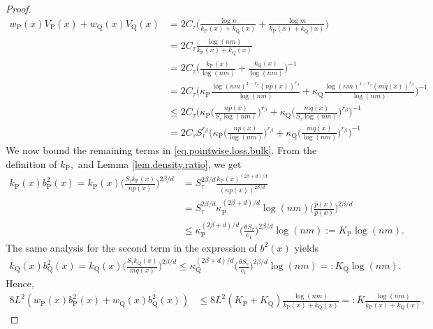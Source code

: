 \documentclass[10pt,a4paper]{amsart}
\renewcommand{\P}{\operatorname{P}}
\newcommand{\Q}{\operatorname{Q}}
\renewcommand{\k}{\kappa}
\newcommand{\ol}{\overline}
\newcommand{\wh}{\widehat}
\begin{document}
\begin{proof}
    \begin{align}
        \label{eq.two.sample.local.variance.bound}
        w_{\P}(x)V_{\P}(x) + w_{\Q}(x)V_{\Q}(x) &= 2C_\tau\Big(\frac{\log n}{k_{\P}(x) + k_{\Q}(x)} + \frac{\log m}{k_{\P}(x) + k_{\Q}(x)}\Big)\nonumber\\
        &= 2C_\tau\frac{\log (nm)}{k_{\P}(x) + k_{\Q}(x)}\\
        & = 2C_\tau \Big(\frac{k_{\P}(x)}{\log (nm)} + \frac{k_{\Q}(x)}{\log (nm)}\Big)^{-1}\nonumber\\
        &= 2C_\tau \Bigg(\k_{\P}\frac{\log(nm)^{1 - r_\beta}(n\wh p(x))^{r_\beta}}{\log(nm)} + \k_{\Q}\frac{\log(nm)^{1 - r_\beta}(m\wh q(x))^{r_\beta}}{\log(nm)}\Bigg)^{-1}\nonumber\\
        &\leq 2C_\tau \Bigg(\k_{\P}\bigg(\frac{np(x)}{S_\tau\log(nm)}\bigg)^{r_\beta} + \k_{\Q}\bigg(\frac{m q(x)}{S_\tau \log(nm)}\bigg)^{r_\beta}\Bigg)^{-1}\nonumber\\
        &= 2C_\tau S_\tau^{r_\beta} \Bigg(\k_{\P}\bigg(\frac{np(x)}{\log(nm)}\bigg)^{r_\beta} + \k_{\Q}\bigg(\frac{m q(x)}{\log(nm)}\bigg)^{r_\beta}\Bigg)^{-1}
    \end{align}
    We now bound the remaining terms in \eqref{eq.pointwise.loss.bulk}. From the definition of $k_{\P},$ and Lemma \ref{lem.density.ratio}, we get
    \begin{align*}
        k_{\P}(x)b_{\P}^2(x) = k_{\P}(x)\bigg(\frac{S_\tau k_{\P}(x)}{np(x)}\bigg)^{2\beta/d} &= S_\tau^{2\beta/d}\frac{k_{\P}(x)^{(2\beta + d)/d}}{(np(x))^{2\beta/d}}\\
        &=S_\tau^{2\beta/d}\k_{\P}^{(2\beta + d)/d}\log(nm)\bigg(\frac{\wh p(x)}{p(x)}\bigg)^{2\beta/d}\\
        &\leq \k_{\P}^{(2\beta + d)/d}\bigg(\frac{\theta S_\tau}{c_1}\bigg)^{2\beta/d}\log(nm) := K_{\P}\log(nm).
    \end{align*}
    The same analysis for the second term in the expression of $b^2(x)$ yields
    \begin{align*}
        k_{\Q}(x)b_{\Q}^2(x) = k_{\Q}(x)\bigg(\frac{S_\tau k_{\Q}(x)}{mq(x)}\bigg)^{2\beta/d} \leq \k_{\Q}^{(2\beta + d)/d}\bigg(\frac{\theta S_\tau}{c_1}\bigg)^{2\beta/d}\log(nm) =: K_{\Q}\log(nm).
    \end{align*}
    Hence,
    \begin{align*}
        8L^2(w_{\P}(x)b^2_{\P}(x) + w_{\Q}(x)b^2_{\Q}(x)) &\leq 8L^2(K_{\P} + K_{\Q})\frac{\log(nm)}{k_{\P}(x) + k_{\Q}(x)} =: \ol K\frac{\log(nm)}{k_{\P}(x) + k_{\Q}(x)},
    \end{align*}

\end{proof}
\end{document}
